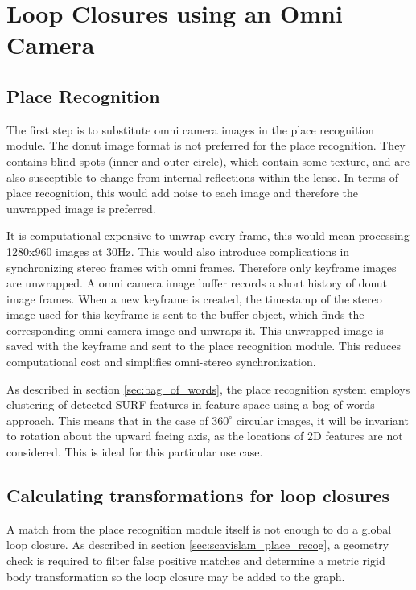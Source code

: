 \chapter{Loop Closures using an Omni Camera}
\label{chapter:omni_loop_close}

\section{Place Recognition}

The first step is to substitute omni camera images in the place recognition module. The donut image format is not preferred for the place recognition.  They contains blind spots (inner and outer circle), which contain some texture, and are also susceptible to change from internal reflections within the lense.  In terms of place recognition, this would add noise to each image and therefore the unwrapped image is preferred.

It is computational expensive to unwrap every frame, this would mean processing 1280x960 images at 30Hz.  This would also introduce complications in synchronizing stereo frames with omni frames.  Therefore only keyframe images are unwrapped.  A omni camera image buffer records a short history of donut image frames.  When a new keyframe is created, the timestamp of the stereo image used for this keyframe is sent to the buffer object, which finds the corresponding omni camera image and unwraps it.  This unwrapped image is saved with the keyframe and sent to the place recognition module.  This reduces computational cost and simplifies omni-stereo synchronization.

As described in section \ref{sec:bag_of_words}, the place recognition system employs clustering of detected SURF features in feature space using a bag of words approach.  This means that in the case of $360^\circ$ circular images, it will be invariant to rotation about the upward facing axis, as the locations of 2D features are not considered.  This is ideal for this particular use case.

\section{Calculating transformations for loop closures}

A match from the place recognition module itself is not enough to do a global loop closure.  As described in section \ref{sec:scavislam_place_recog}, a geometry check is required to filter false positive matches and determine a metric rigid body transformation so the loop closure may be added to the graph.

